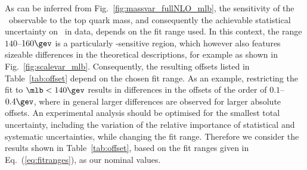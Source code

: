 As can be inferred from Fig.~\ref{fig:massvar_fullNLO_mlb}, the sensitivity of
the \mlb\ observable to the top quark mass, and consequently the achievable
statistical uncertainty on \mt\ in data, depends on the fit range used.
%
In this context, the range $140$--$160\gev$ is a particularly \mt-sensitive
region, which however also features sizeable differences in the theoretical
descriptions, for example as shown in Fig.~\ref{fig:scalevar_mlb}.
%
Consequently, the resulting offsets listed in Table~\ref{tab:offset}
depend on the chosen fit range.
%
As an example, restricting the fit to $\mlb<140\gev$ results in
differences in the offsets of the order of $0.1$--$0.4\gev$, where in
general larger differences are observed for larger absolute offsets.
%
An experimental analysis should be optimised for the smallest total
uncertainty, including the variation of the relative importance of statistical
and systematic uncertainties, while changing the fit range. Therefore we
consider the results shown in Table~\ref{tab:offset}, based on the fit ranges
given in Eq.~(\ref{eq:fitranges}), as our nominal values.


